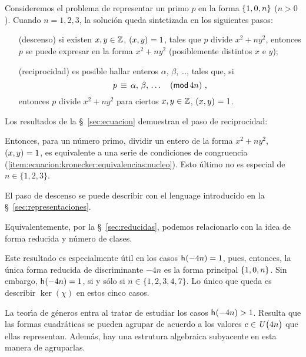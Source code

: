 \theoremstyle{plain}

\theoremstyle{definition}
\newtheorem{ejemResumen}{\ejemname}[section]


Consideremos el problema de representar un primo $p$ en la forma
$\binaria{1,0,n}$ ($n>0$). Cuando $n=1,2,3$, la soluci\'on queda
sintetizada en los siguientes pasos:
\begin{itemize}
	\item[(descenso)]
		si existen $x,y\in\Enteros$, $\mcd{x,y}=1$,
		tales que $p$ divide $x^2+ny^2$, entonces $p$ se
		puede expresar en la forma $x^2+ny^2$ (posiblemente
		distintos $x$ e $y$);
	\item[(reciprocidad)]
		es posible hallar enteros $\alpha$, $\beta$, \dots,
		tales que, si
		\begin{displaymath}
			p\,\equiv\,\alpha,\,\beta,\,\dots
				\modulo[4n]
			\dispcomma
		\end{displaymath}
		entonces $p$ divide $x^2+ny^2$ para ciertos
		$x,y\in\Enteros$, $\mcd{x,y}=1$.
\end{itemize}
%
Los resultados de la \S~\ref{sec:ecuacion} demuestran el paso
de reciprocidad:

\teoEcuacionKronecker*

Entonces, para un n\'umero primo, dividir un entero de la forma
$x^2+ny^2$, $\mcd{x,y}=1$, es equivalente a una serie de condiciones
de congruencia (\eqref{item:ecuacion:kronecker:equivalencias:nucleo}).
Esto \'ultimo no es especial de $n\in\{1,2,3\}$.

El paso de descenso se puede describir con el lenguage introducido en
la \S~\ref{sec:representaciones}.

\coroRepresentacionesDescenso*

Equivalentemente, por la \S~\ref{sec:reducidas}, podemos relacionarlo
con la idea de forma reducida y n\'umero de clases.

\coroReducidasDescenso*

Este resultado es especialmente \'util en los casos
$\nClases(-4n)=1$, pues, entonces, la \'unica forma reducida de
discriminante $-4n$ es la forma principal $\binaria{1,0,n}$.
Sin embargo, $\nClases(-4n)=1$, si y s\'olo si
$n\in\{1,2,3,4,7\}$. Lo \'unico que queda es describir $\ker(\chi)$
en estos cinco casos.

La teor\'{\i}a de g\'eneros entra al tratar de estudiar los casos
$\nClases(-4n)>1$. Resulta que las formas cuadr\'aticas se pueden
agrupar de acuerdo a los valores $c\in\Unidadesmod[4n]$ que ellas
representan. Adem\'as, hay una estrutura algebraica subyacente en
esta manera de agruparlas.

